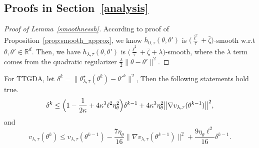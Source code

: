 \documentclass[sigconf]{acmart}
\begin{document}

\subsection{Proofs in Section~\ref{analysis}}
\begin{proof}[Proof of Lemma~\ref{smoothnessh}]
According to proof of Proposition~\ref{prop:smooth_approx}, we know $h_{0,\tau}(\theta,\theta')$ is $\big(\frac{\bar{\ell}^2}{\tau}+\bar{\zeta}\big)$-smooth w.r.t $\theta, \theta'\in \mathbb{R}^d$. Then, we have $h_{\lambda,\tau}(\theta,\theta')$ is $\big(\frac{\bar{\ell}^2}{\tau}+\bar{\zeta}+ \lambda \big) $-smooth, where the $\lambda$ term comes from the quadratic regularizer $\frac{\lambda}{2}\|\theta-\theta'\|^2$.
\end{proof}


\begin{lemma}
For TTGDA, let $\delta^k=\bigl\|\theta^{\star}_{\lambda,\tau}(\theta^k)-\theta'^k\bigr\|^2$,
Then the following statements hold true.
\begin{equation}
\label{eq:delta}
\delta^k\le\Bigl(1-\frac{1}{2\kappa}+4\kappa^3\ell^2\eta_{\theta}^2\Bigr)\delta^{k-1}+4\kappa^3\eta_{\theta}^2\bigl\|\nabla v_{\lambda,\tau}(\theta^{k-1})\bigr\|^2,
\end{equation}
and 
\begin{equation}
\label{eq:vdescent}
v_{\lambda,\tau}(\theta^k)\le v_{\lambda,\tau}(\theta^{k-1})-\frac{7\eta_{\theta}}{16}\bigl\|\nabla v_{\lambda,\tau}(\theta^{k-1})\bigr\|^2+\frac{9\eta_{\theta}\ell^2}{16}\delta^{k-1}.
\end{equation}
\end{lemma}
\end{document}
